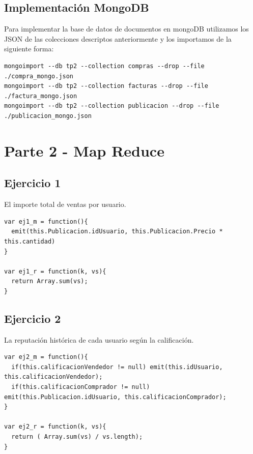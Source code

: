\documentclass[a4paper, 10pt, twoside]{article}
\begin{document}
\subsection{Implementaci\'on MongoDB}
Para implementar la base de datos de documentos en mongoDB utilizamos los JSON de las colecciones descriptos anteriormente y los importamos de la siguiente forma:

\begin{verbatim}
mongoimport --db tp2 --collection compras --drop --file ./compra_mongo.json 
mongoimport --db tp2 --collection facturas --drop --file ./factura_mongo.json
mongoimport --db tp2 --collection publicacion --drop --file ./publicacion_mongo.json
\end{verbatim}
\section{Parte 2 - Map Reduce}
\subsection{Ejercicio 1}
El importe total de ventas por usuario.


\begin{lstlisting}
var ej1_m = function(){ 
  emit(this.Publicacion.idUsuario, this.Publicacion.Precio * this.cantidad) 
}

var ej1_r = function(k, vs){
  return Array.sum(vs);
}

\end{lstlisting}


\subsection{Ejercicio 2}
La reputaci\'on hist\'orica de cada usuario seg\'un la calificaci\'on.

\begin{lstlisting}
var ej2_m = function(){
  if(this.calificacionVendedor != null) emit(this.idUsuario, this.calificacionVendedor);
  if(this.calificacionComprador != null) emit(this.Publicacion.idUsuario, this.calificacionComprador);
}

var ej2_r = function(k, vs){
  return ( Array.sum(vs) / vs.length);
}
\end{lstlisting}
\end{document}
